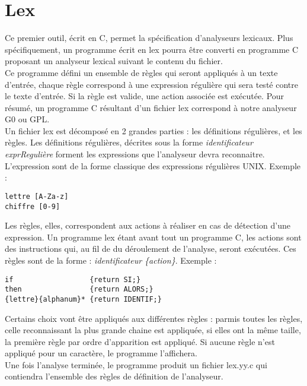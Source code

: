 \documentclass[a4paper,11pt]{article}
\newcommand{\br}{\\\mbox{}}
\begin{document}
\section{Lex}
Ce premier outil, écrit en C, permet la spécification d'analyseurs lexicaux.  Plus spécifiquement, un programme écrit en lex pourra être converti en programme C proposant un analyseur lexical suivant le contenu du fichier.\br
Ce programme défini un ensemble de règles qui seront appliqués à un texte d'entrée, chaque règle correspond à une expression régulière qui sera testé contre le texte d'entrée. Si la règle est valide, une action associée est exécutée. Pour résumé, un programme C résultant d'un fichier lex correspond à notre analyseur G0 ou GPL.\br
Un fichier lex est décomposé en 2 grandes parties : les définitions régulières, et les règles. Les définitions régulières, décrites sous la forme \textit{identificateur exprRegulière} forment les expressions que l'analyseur devra reconnaitre. L'expression sont de la forme classique des expressions régulières UNIX. Exemple :
\begin{lstlisting}
lettre [A-Za-z]
chiffre [0-9]
\end{lstlisting}
Les règles, elles, correspondent aux actions à réaliser en cas de détection d'une expression. Un programme lex étant avant tout un programme C, les actions sont des instructions qui, au fil de du déroulement de l'analyse, seront exécutées. Ces règles sont de la forme : \textit{identificateur \{action\}}. Exemple :
\begin{lstlisting}
if                  {return SI;}
then                {return ALORS;}
{lettre}{alphanum}* {return IDENTIF;}
\end{lstlisting}
Certains choix vont être appliqués aux différentes règles : parmis toutes les règles, celle reconnaissant la plus grande chaine est appliquée, si elles ont la même taille, la première règle par ordre d'apparition est appliqué. Si aucune règle n'est appliqué pour un caractère, le programme l'affichera.\br
Une fois l'analyse terminée, le programme produit un fichier lex.yy.c qui contiendra l'ensemble des règles de définition de l'analyseur.
\end{document}
